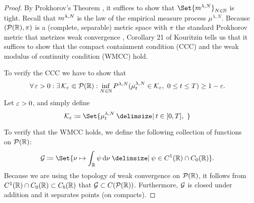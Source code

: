 \documentclass{article}
\begin{document}
\begin{proof}
By Prokhorov's Theorem \cite[Theorem 5.1]{billingsley_convergence_1999}, it suffices to show that $\Set{ \lawmu^{\lambda, N} }_{N\in\bN}$ is tight.
Recall that $m^{\lambda, N}$ is the law of the empirical measure process $\mu^{\lambda, N}$.
Because $(\mathcal{P}(\mathbb{R}), \pi)$ is a (complete, separable) metric space with $\pi$ the standard Prokhorov metric that metrizes weak convergence \cite[Theorem 6.8]{billingsley_convergence_1999}, Corollary 21 of Kouritzin \cite{kouritzin_tightness_2015} tells us that it suffices to show that the compact containment condition (CCC) and the weak modulus of continuity condition (WMCC) hold.

To verify the CCC we have to show that
\begin{equation}
    \forall \eps > 0 : \exists \cK_\eps \Subset \cP(\potspace) :
    \inf_{N\in\bN} P^{\lambda, N} (\mu_t^{\lambda, N} \in \cK_\eps,\ 0 \leq t \leq T) \geq 1 - \eps.
\end{equation}
Let $\varepsilon > 0$, and simply define
\begin{equation}
    \cK_\eps \coloneqq \Set{ \mu_t^{\lambda, N} \given t \in [0,T],\  }
\end{equation}


\bigskip

To verify that the WMCC holds, we define the following collection of functions on $\mathcal{P}(\mathbb{R})$:
\begin{equation}
    \cG \coloneqq \Set{\nu \mapsto \int_\potspace \psi \odif{\nu} \given \psi \in C^1(\potspace) \cap C_0(\potspace)}.
\end{equation}
Because we are using the topology of weak convergence on $\mathcal{P}(\mathbb{R})$, it follows from $C^1(\mathbb{R}) \cap C_0(\mathbb{R}) \subset C_b(\mathbb{R})$ that $\mathcal{G} \subset C(\mathcal{P}(\mathbb{R}))$.
Furthermore, $\mathcal{G}$ is closed under addition and it separates points (on compacts).


\end{proof}
\end{document}
